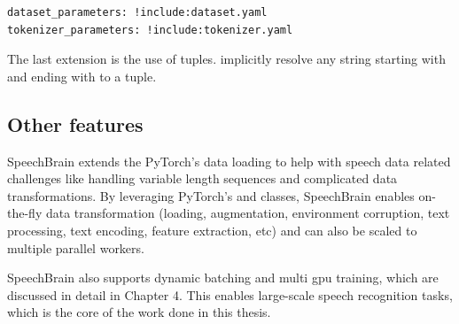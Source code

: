 \begin{verbatim}
dataset_parameters: !include:dataset.yaml
tokenizer_parameters: !include:tokenizer.yaml
\end{verbatim}

The last extension is the use of tuples. implicitly resolve any string starting with \inlinecode{(} and ending with \inlinecode{)} to a tuple.

\subsection{Other features}
SpeechBrain extends the PyTorch's data loading to help with speech data related challenges like handling variable length sequences and complicated data transformations. By leveraging PyTorch's  and  classes, SpeechBrain enables on-the-fly data transformation (loading, augmentation, environment corruption, text processing, text encoding, feature extraction, etc) and can also be scaled to multiple parallel workers.

SpeechBrain also supports dynamic batching and multi \acrshort{gpu} training, which are discussed in detail in Chapter 4. This enables large-scale speech recognition tasks, which is the core of the work done in this thesis.  